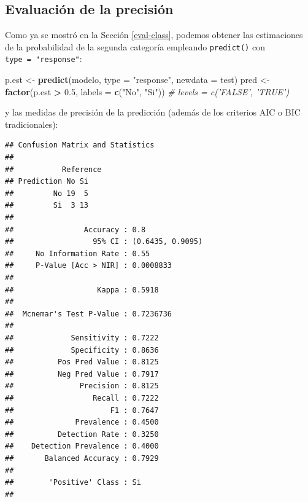 \documentclass[
]{book}
\newenvironment{Shaded}{\begin{snugshade}}{\end{snugshade}}
\newcommand{\CommentTok}[1]{\textcolor[rgb]{0.56,0.35,0.01}{\textit{#1}}}
\newcommand{\DataTypeTok}[1]{\textcolor[rgb]{0.13,0.29,0.53}{#1}}
\newcommand{\FloatTok}[1]{\textcolor[rgb]{0.00,0.00,0.81}{#1}}
\newcommand{\KeywordTok}[1]{\textcolor[rgb]{0.13,0.29,0.53}{\textbf{#1}}}
\newcommand{\NormalTok}[1]{#1}
\newcommand{\OperatorTok}[1]{\textcolor[rgb]{0.81,0.36,0.00}{\textbf{#1}}}
\newcommand{\StringTok}[1]{\textcolor[rgb]{0.31,0.60,0.02}{#1}}
\theoremstyle{break}
\theoremstyle{definition}
\theoremstyle{definition}
\theoremstyle{definition}
\theoremstyle{remark}
\begin{document}
\hypertarget{evaluaciuxf3n-de-la-precisiuxf3n-1}{%
\subsection{Evaluación de la precisión}\label{evaluaciuxf3n-de-la-precisiuxf3n-1}}

Como ya se mostró en la Sección \ref{eval-class}, podemos obtener las estimaciones de la probabilidad de la segunda categoría empleando \texttt{predict()} con \texttt{type\ =\ "response"}:

\begin{Shaded}
\begin{Highlighting}[]
\NormalTok{p.est <-}\StringTok{ }\KeywordTok{predict}\NormalTok{(modelo, }\DataTypeTok{type =} \StringTok{"response"}\NormalTok{, }\DataTypeTok{newdata =}\NormalTok{ test)}
\NormalTok{pred <-}\StringTok{ }\KeywordTok{factor}\NormalTok{(p.est }\OperatorTok{>}\StringTok{ }\FloatTok{0.5}\NormalTok{, }\DataTypeTok{labels =} \KeywordTok{c}\NormalTok{(}\StringTok{"No"}\NormalTok{, }\StringTok{"Si"}\NormalTok{)) }\CommentTok{# levels = c('FALSE', 'TRUE')}
\end{Highlighting}
\end{Shaded}

y las medidas de precisión de la predicción (además de los criterios AIC o BIC tradicionales):

\begin{Shaded}
\end{Shaded}

\begin{verbatim}
## Confusion Matrix and Statistics
## 
##           Reference
## Prediction No Si
##         No 19  5
##         Si  3 13
##                                           
##                Accuracy : 0.8             
##                  95% CI : (0.6435, 0.9095)
##     No Information Rate : 0.55            
##     P-Value [Acc > NIR] : 0.0008833       
##                                           
##                   Kappa : 0.5918          
##                                           
##  Mcnemar's Test P-Value : 0.7236736       
##                                           
##             Sensitivity : 0.7222          
##             Specificity : 0.8636          
##          Pos Pred Value : 0.8125          
##          Neg Pred Value : 0.7917          
##               Precision : 0.8125          
##                  Recall : 0.7222          
##                      F1 : 0.7647          
##              Prevalence : 0.4500          
##          Detection Rate : 0.3250          
##    Detection Prevalence : 0.4000          
##       Balanced Accuracy : 0.7929          
##                                           
##        'Positive' Class : Si              
## 
\end{verbatim}
\end{document}
